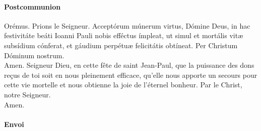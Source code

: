 \documentclass[twoside]{article}
\begin{document}
\paragraph{Postcommunion}
\begin{paracol}{2}
\vv Orémus.
\switchcolumn
\vv Prions le Seigneur.
\switchcolumn*
Acceptórum múnerum virtus, Dómine Deus,
in hac festivitáte beáti Ioanni Pauli nobis efféctus ímpleat,
ut simul et mortális vitæ subsídium cónferat,
et gáudium perpétuæ felicitátis obtíneat.
Per Christum Dóminum nostrum.\\
\rr Amen.
\switchcolumn
Seigneur Dieu, en cette fête de saint Jean-Paul, que la puissance des dons reçus de toi
soit en nous pleinement efficace,
qu'elle nous apporte un secours pour cette vie mortelle
et nous obtienne la joie de l'éternel bonheur.
Par le Christ, notre Seigneur. \\
\rr Amen.
\end{paracol}

\paragraph{Envoi}


\begin{paracol}{2}
\end{paracol}
\end{document}
